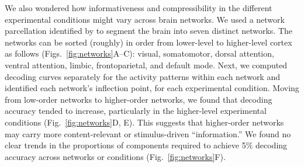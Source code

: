\documentclass[english, 11pt]{article}
\begin{document}
We also wondered how informativeness and compressibility in the different
experimental conditions might vary across brain networks. We used a network
parcellation identified by \cite{YeoEtal11} to segment the brain into seven
distinct networks. The networks can be sorted (roughly) in order from
lower-level to higher-level cortex as follows (Figs.~\ref{fig:networks}A--C):
visual, somatomotor, dorsal attention, ventral attention, limbic,
frontoparietal, and default mode. Next, we computed decoding curves separately
for the activity patterns within each network and identified each network's
inflection point, for each experimental condition. Moving from low-order
networks to higher-order networks, we found that decoding accuracy tended to
increase, particularly in the higher-level experimental conditions
(Fig.~\ref{fig:networks}D, E). This suggests that higher-order networks may
carry more content-relevant or stimulus-driven ``information.'' We found no
clear trends in the proportions of components required to achieve 5\% decoding
accuracy across networks or conditions (Fig.~\ref{fig:networks}F).
\end{document}
